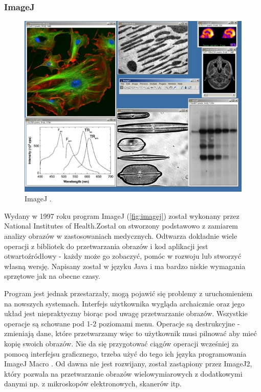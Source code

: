 \subsubsection{ImageJ}
\begin{figure}[H]
    \centering
    \includegraphics[width=0.8\linewidth]{./images/Picture3.jpg}
    \caption{ImageJ \cite{imagej}.}
    \label{fig:imagej}
\end{figure}

Wydany w 1997 roku program ImageJ (\autoref{fig:imagej}) został wykonany przez National Institutes of Health.Został on stworzony podstawowo z zamiarem analizy obrazów w zastosowaniach medycznych. 
Odtwarza dokładnie wiele operacji z bibliotek do przetwarzania obrazów i kod aplikacji jest otwartoźródłowy - każdy może go zobaczyć, pomóc w rozwoju lub stworzyć własną wersję. 
Napisany został w języku Java i ma bardzo niskie wymagania sprzętowe jak na obecne czasy.

Program jest jednak przestarzały, mogą pojawić się problemy z uruchomieniem na nowszych systemach. Interfejs użytkownika wygląda archaicznie oraz jego układ jest niepraktyczny biorąc pod uwagę przetwarzanie obrazów. 
Wszystkie operacje są schowane pod 1-2 poziomami menu. 
Operacje są destrukcyjne - zmieniają dane, które przetwarzamy więc to użytkownik musi pilnować aby mieć kopię swoich obrazów. 
Nie da się przygotować ciągów operacji wcześniej za pomocą interfejsu graficznego, trzeba użyć do tego ich języka programowania ImageJ Macro \cite{imagejbatch}. 
Od dawna nie jest rozwijany, został zastąpiony przez ImageJ2, który pozwala na przetwarzanie obrazów wielowymiarowych z dodatkowymi danymi np. z mikroskopów elektronowych, skanerów itp.

